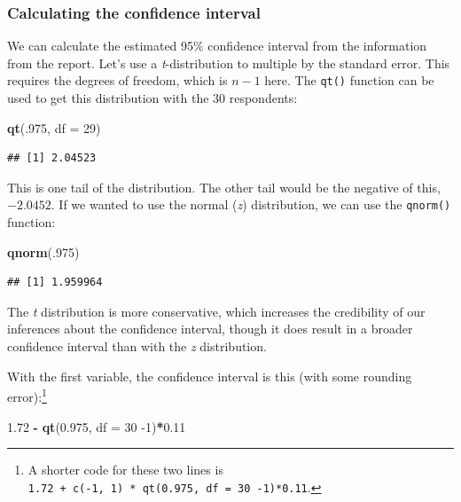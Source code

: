 \documentclass[
]{article}
\newenvironment{Shaded}{\begin{snugshade}}{\end{snugshade}}
\newcommand{\DataTypeTok}[1]{\textcolor[rgb]{0.13,0.29,0.53}{#1}}
\newcommand{\DecValTok}[1]{\textcolor[rgb]{0.00,0.00,0.81}{#1}}
\newcommand{\FloatTok}[1]{\textcolor[rgb]{0.00,0.00,0.81}{#1}}
\newcommand{\KeywordTok}[1]{\textcolor[rgb]{0.13,0.29,0.53}{\textbf{#1}}}
\newcommand{\NormalTok}[1]{#1}
\newcommand{\OperatorTok}[1]{\textcolor[rgb]{0.81,0.36,0.00}{\textbf{#1}}}
\newcommand{\StringTok}[1]{\textcolor[rgb]{0.31,0.60,0.02}{#1}}
\begin{document}
\hypertarget{calculating-the-confidence-interval}{%
\subsubsection{Calculating the confidence interval}\label{calculating-the-confidence-interval}}

We can calculate the estimated 95\% confidence interval from the information from the report. Let's use a \emph{t}-distribution to multiple by the standard error. This requires the degrees of freedom, which is \(n - 1\) here. The \texttt{qt()} function can be used to get this distribution with the 30 respondents:

\begin{Shaded}
\begin{Highlighting}[]
\KeywordTok{qt}\NormalTok{(.}\DecValTok{975}\NormalTok{, }\DataTypeTok{df =} \DecValTok{29}\NormalTok{) }
\end{Highlighting}
\end{Shaded}

\begin{verbatim}
## [1] 2.04523
\end{verbatim}

This is one tail of the distribution. The other tail would be the negative of this, \(-2.0452\). If we wanted to use the normal (\emph{z}) distribution, we can use the \texttt{qnorm()} function:

\begin{Shaded}
\begin{Highlighting}[]
\KeywordTok{qnorm}\NormalTok{(.}\DecValTok{975}\NormalTok{)}
\end{Highlighting}
\end{Shaded}

\begin{verbatim}
## [1] 1.959964
\end{verbatim}

The \emph{t} distribution is more conservative, which increases the credibility of our inferences about the confidence interval, though it does result in a broader confidence interval than with the \emph{z} distribution.

With the first variable, the confidence interval is this (with some rounding error):\footnote{A shorter code for these two lines is \texttt{1.72\ +\ c(-1,\ 1)\ *\ qt(0.975,\ df\ =\ 30\ -1)*0.11}.}

\begin{Shaded}
\begin{Highlighting}[]
\FloatTok{1.72} \OperatorTok{-}\StringTok{ }\KeywordTok{qt}\NormalTok{(}\FloatTok{0.975}\NormalTok{, }\DataTypeTok{df =} \DecValTok{30} \DecValTok{-1}\NormalTok{)}\OperatorTok{*}\FloatTok{0.11}
\end{Highlighting}
\end{Shaded}
\end{document}
